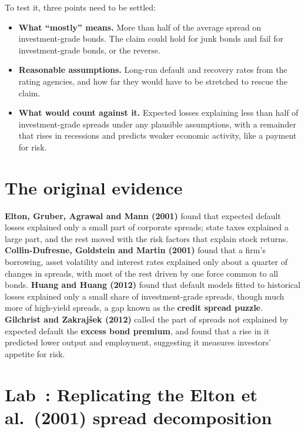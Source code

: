 To test it, three points need to be settled:

\begin{itemize}
  \item \textbf{What ``mostly'' means.} More than half of the average spread on investment-grade bonds. The claim could hold for junk bonds and fail for investment-grade bonds, or the reverse.
  \item \textbf{Reasonable assumptions.} Long-run default and recovery rates from the rating agencies, and how far they would have to be stretched to rescue the claim.
  \item \textbf{What would count against it.} Expected losses explaining less than half of investment-grade spreads under any plausible assumptions, with a remainder that rises in recessions and predicts weaker economic activity, like a payment for risk.
\end{itemize}

\section{The original evidence}
\label{sec:15-evidence}

\textbf{Elton, Gruber, Agrawal and Mann (2001)} found that expected default losses explained only a small part of corporate spreads; state taxes explained a large part, and the rest moved with the risk factors that explain stock returns. \textbf{Collin-Dufresne, Goldstein and Martin (2001)} found that a firm's borrowing, asset volatility and interest rates explained only about a quarter of changes in spreads, with most of the rest driven by one force common to all bonds. \textbf{Huang and Huang (2012)} found that default models fitted to historical losses explained only a small share of investment-grade spreads, though much more of high-yield spreads, a gap known as the \textbf{credit spread puzzle}. \textbf{Gilchrist and Zakraj\v{s}ek (2012)} called the part of spreads not explained by expected default the \textbf{excess bond premium}, and found that a rise in it predicted lower output and employment, suggesting it measures investors' appetite for risk.

\section{Lab~\thechapter: Replicating the Elton et al.\ (2001) spread decomposition}
\label{sec:15-lab}

